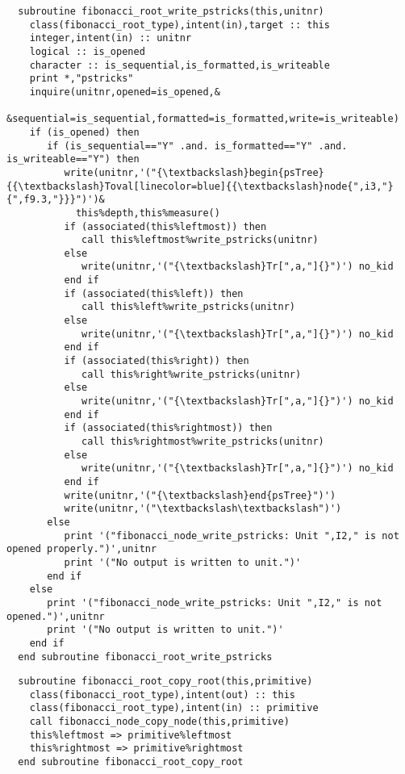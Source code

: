 \begin{Verbatim}
  subroutine fibonacci_root_write_pstricks(this,unitnr)
    class(fibonacci_root_type),intent(in),target :: this
    integer,intent(in) :: unitnr
    logical :: is_opened
    character :: is_sequential,is_formatted,is_writeable
    print *,"pstricks"
    inquire(unitnr,opened=is_opened,&
         &sequential=is_sequential,formatted=is_formatted,write=is_writeable)
    if (is_opened) then
       if (is_sequential=="Y" .and. is_formatted=="Y" .and. is_writeable=="Y") then
          write(unitnr,'("{\textbackslash}begin{psTree}{{\textbackslash}Toval[linecolor=blue]{{\textbackslash}node{",i3,"}{",f9.3,"}}}")')&
            this%depth,this%measure()
          if (associated(this%leftmost)) then
             call this%leftmost%write_pstricks(unitnr)
          else
             write(unitnr,'("{\textbackslash}Tr[",a,"]{}")') no_kid
          end if
          if (associated(this%left)) then
             call this%left%write_pstricks(unitnr)
          else
             write(unitnr,'("{\textbackslash}Tr[",a,"]{}")') no_kid
          end if
          if (associated(this%right)) then
             call this%right%write_pstricks(unitnr)
          else
             write(unitnr,'("{\textbackslash}Tr[",a,"]{}")') no_kid
          end if
          if (associated(this%rightmost)) then
             call this%rightmost%write_pstricks(unitnr)
          else
             write(unitnr,'("{\textbackslash}Tr[",a,"]{}")') no_kid
          end if
          write(unitnr,'("{\textbackslash}end{psTree}")')
          write(unitnr,'("\textbackslash\textbackslash")')
       else
          print '("fibonacci_node_write_pstricks: Unit ",I2," is not opened properly.")',unitnr
          print '("No output is written to unit.")'
       end if
    else
       print '("fibonacci_node_write_pstricks: Unit ",I2," is not opened.")',unitnr
       print '("No output is written to unit.")' 
    end if
  end subroutine fibonacci_root_write_pstricks
\end{Verbatim}

\begin{Verbatim}
  subroutine fibonacci_root_copy_root(this,primitive)
    class(fibonacci_root_type),intent(out) :: this
    class(fibonacci_root_type),intent(in) :: primitive
    call fibonacci_node_copy_node(this,primitive)
    this%leftmost => primitive%leftmost
    this%rightmost => primitive%rightmost
  end subroutine fibonacci_root_copy_root
\end{Verbatim}

